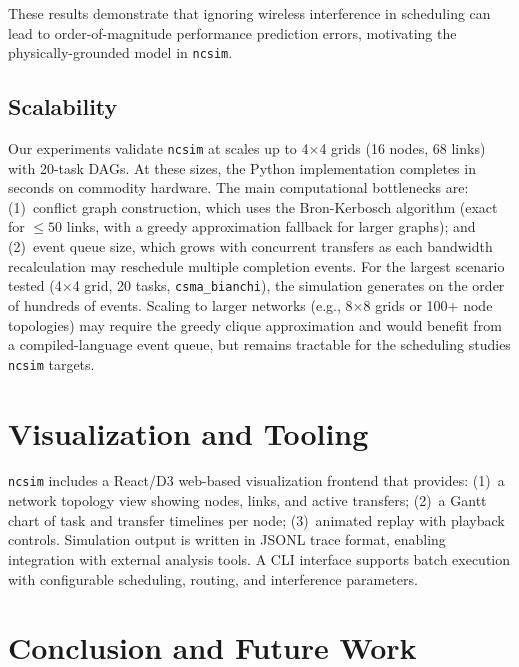 \documentclass[conference]{IEEEtran}
\newcommand{\ncsim}{\texttt{ncsim}}
\begin{document}
\noindent These results demonstrate that ignoring wireless interference in
scheduling can lead to order-of-magnitude performance prediction errors,
motivating the physically-grounded model in \ncsim{}.

\subsection{Scalability}
\label{sec:scalability}

Our experiments validate \ncsim{} at scales up to 4$\times$4 grids (16
nodes, 68 links) with 20-task DAGs.  At these sizes, the Python
implementation completes in seconds on commodity hardware.  The main
computational bottlenecks are: (1)~conflict graph construction, which uses
the Bron-Kerbosch algorithm (exact for $\leq 50$ links, with a greedy
approximation fallback for larger graphs); and (2)~event queue size, which
grows with concurrent transfers as each bandwidth recalculation may
reschedule multiple completion events.  For the largest scenario tested
(4$\times$4 grid, 20 tasks, \texttt{csma\_bianchi}), the simulation
generates on the order of hundreds of events.  Scaling to larger networks
(e.g., 8$\times$8 grids or 100+ node topologies) may require the greedy
clique approximation and would benefit from a compiled-language event queue,
but remains tractable for the scheduling studies \ncsim{} targets.

\section{Visualization and Tooling}
\label{sec:viz}

\ncsim{} includes a React/D3 web-based visualization frontend that provides:
(1)~a network topology view showing nodes, links, and active transfers;
(2)~a Gantt chart of task and transfer timelines per node;
(3)~animated replay with playback controls.  Simulation output is written in
JSONL trace format, enabling integration with external analysis tools.  A CLI
interface supports batch execution with configurable scheduling, routing, and
interference parameters.

\section{Conclusion and Future Work}
\label{sec:conclusion}
\end{document}
